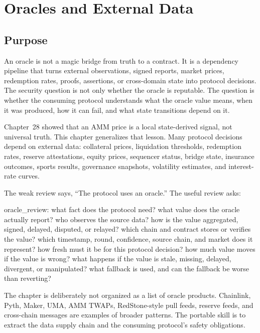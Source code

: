 \chapter{Oracles and External Data}

\section{Purpose}

\begin{principlebox}
An oracle is not a magic bridge from truth to a contract. It is a dependency pipeline that turns external observations, signed reports, market prices, redemption rates, proofs, assertions, or cross-domain state into protocol decisions. The security question is not only whether the oracle is reputable. The question is whether the consuming protocol understands what the oracle value means, when it was produced, how it can fail, and what state transitions depend on it.
\end{principlebox}

Chapter~28 showed that an AMM price is a local state-derived signal, not universal truth. This chapter generalizes that lesson. Many protocol decisions depend on external data: collateral prices, liquidation thresholds, redemption rates, reserve attestations, equity prices, sequencer status, bridge state, insurance outcomes, sports results, governance snapshots, volatility estimates, and interest-rate curves.

The weak review says, ``The protocol uses an oracle.'' The useful review asks:

\begin{codeblock}
oracle_review:
    what fact does the protocol need?
    what value does the oracle actually report?
    who observes the source data?
    how is the value aggregated, signed, delayed, disputed, or relayed?
    which chain and contract stores or verifies the value?
    which timestamp, round, confidence, source chain, and market does it represent?
    how fresh must it be for this protocol decision?
    how much value moves if the value is wrong?
    what happens if the value is stale, missing, delayed, divergent, or manipulated?
    what fallback is used, and can the fallback be worse than reverting?
\end{codeblock}

The chapter is deliberately not organized as a list of oracle products. Chainlink, Pyth, Maker, UMA, AMM TWAPs, RedStone-style pull feeds, reserve feeds, and cross-chain messages are examples of broader patterns. The portable skill is to extract the data supply chain and the consuming protocol's safety obligations.

